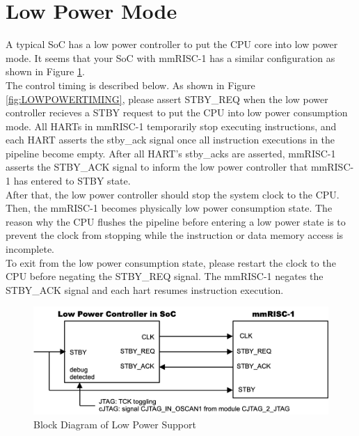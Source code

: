 \section{Low Power Mode}
\label{sec:LOWPOWERMODE}

A typical SoC has a low power controller to put the CPU core into low power mode. It seems that your SoC with mmRISC-1 has a similar configuration as shown in Figure \ref{fig:LOWPOWERBLOCKDIAGRAM}.\\

The control timing is described below. As shown in Figure \ref{fig:LOWPOWERTIMING}, please assert STBY\_REQ when the low power controller recieves a STBY request to put the CPU into low power consumption mode. All HARTs in mmRISC-1 temporarily stop executing instructions, and each HART asserts the stby\_ack signal once all instruction executions in the pipeline become empty. After all HART's stby\_acks are asserted, mmRISC-1 asserts the STBY\_ACK signal to inform the low power controller that mmRISC-1 has entered to STBY state.\\
After that, the low power controller should stop the system clock to the CPU. Then, the mmRISC-1 becomes physically low power consumption state. The reason why the CPU flushes the pipeline before entering a low power state is to prevent the clock from stopping while the instruction or data memory access is incomplete.\\

To exit from the low power consumption state, please restart the clock to the CPU before negating the STBY\_REQ signal. The mmRISC-1 negates the STBY\_ACK signal and each hart resumes instruction execution.\\

\begin{figure}[H]
    \includegraphics[width=1.00\columnwidth]{./Figure/LowPowerBlockDiagram.png}
    \caption{Block Diagram of Low Power Support}
    \label{fig:LOWPOWERBLOCKDIAGRAM}
\end{figure}


